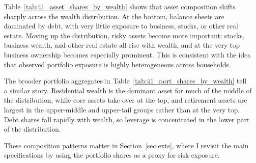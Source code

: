 \par Table~\ref{tab:41_asset_shares_by_wealth} shows that asset composition shifts sharply across the wealth distribution. At the bottom, balance sheets are dominated by debt, with very little exposure to business, stocks, or other real estate. Moving up the distribution, risky assets become more important: stocks, business wealth, and other real estate all rise with wealth, and at the very top business ownership becomes especially prominent. This is consistent with the idea that observed portfolio exposure is highly heterogeneous across households.

\FloatBarrier

\par The broader portfolio aggregates in Table~\ref{tab:41_port_shares_by_wealth} tell a similar story. Residential wealth is the dominant asset for much of the middle of the distribution, while core assets take over at the top, and retirement assets are largest in the upper-middle and upper-tail groups rather than at the very top. Debt shares fall rapidly with wealth, so leverage is concentrated in the lower part of the distribution.


\FloatBarrier

\par These composition patterns matter in Section~\ref{sec:exts}, where I revisit the main specifications by using the portfolio shares as a proxy for risk exposure.
